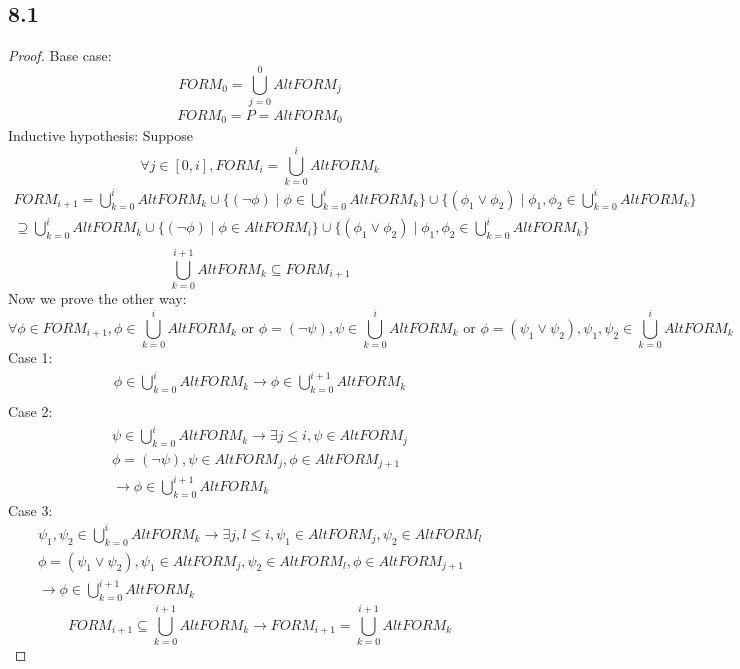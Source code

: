 \documentclass{article}
\newtheorem{lemma}[theorem]{Lemma}
\let\oldlemma\lemma
\let\endoldlemma\endlemma
\renewenvironment{lemma}
  {\begin{tcolorbox}[
      colback=green!8,
      colframe=green!50!black,
      boxrule=0.6pt,
      arc=2pt,
      left=6pt,right=6pt,top=4pt,bottom=4pt
    ]\oldlemma}
  {\endoldlemma\end{tcolorbox}}
\begin{document}
\subsection*{8.1}
\begin{lemma}
    
\end{lemma}
\begin{proof}
    Base case: \[FORM_0 = \bigcup_{j = 0}^0 AltFORM_j\]
    \begin{align*}
        FORM_0 = P = AltFORM_0
    \end{align*}
    Inductive hypothesis: Suppose
    \[\forall j \in [0, i], FORM_i = \bigcup_{k = 0}^i AltFORM_k\]
    \begin{align*}
        FORM_{i+1} = \bigcup_{k = 0}^i AltFORM_k \cup \{(\neg \phi) \mid \phi \in \bigcup_{k = 0}^i AltFORM_k\} \cup \{(\phi_1 \lor \phi_2) \mid \phi_1, \phi_2 \in \bigcup_{k = 0}^i AltFORM_k\}\\
        \supseteq \bigcup_{k = 0}^i AltFORM_k \cup \{(\neg \phi) \mid \phi \in AltFORM_i\} \cup \{(\phi_1 \lor \phi_2) \mid \phi_1, \phi_2 \in \bigcup_{k = 0}^i AltFORM_k\}\\
    \end{align*}
    \[\bigcup_{k = 0}^{i+1} AltFORM_k \subseteq FORM_{i+1}\]
    Now we prove the other way:
    \[\forall \phi \in FORM_{i+1}, \phi \in \bigcup_{k = 0}^i AltFORM_k \text{ or } \phi = (\neg \psi), \psi \in \bigcup_{k = 0}^i AltFORM_k \text{ or } \phi = (\psi_1 \lor \psi_2), \psi_1, \psi_2 \in \bigcup_{k = 0}^i AltFORM_k\]
    Case 1:
    \begin{align*}
        \phi \in \bigcup_{k = 0}^i AltFORM_k \rightarrow \phi \in \bigcup_{k = 0}^{i+1} AltFORM_k\\
    \end{align*}
    Case 2:
    \begin{align*}
        \psi \in  \bigcup_{k = 0}^i AltFORM_k \rightarrow \exists j \leq i, \psi \in AltFORM_j\\
        \phi = (\neg \psi), \psi \in AltFORM_j, \phi \in AltFORM_{j+1}\\
        \rightarrow \phi \in  \bigcup_{k = 0}^{i+1} AltFORM_k
    \end{align*}
    Case 3:
    \begin{align*}
        \psi_1, \psi_2 \in  \bigcup_{k = 0}^i AltFORM_k \rightarrow \exists j,l \leq i, \psi_1 \in AltFORM_j, \psi_2 \in AltFORM_l\\
        \phi = (\psi_1 \lor \psi_2), \psi_1 \in AltFORM_j, \psi_2 \in AltFORM_l, \phi \in AltFORM_{j+1}\\
        \rightarrow \phi \in  \bigcup_{k = 0}^{i+1} AltFORM_k
    \end{align*}
    \[FORM_{i+1} \subseteq  \bigcup_{k = 0}^{i+1} AltFORM_k \rightarrow FORM_{i+1} =  \bigcup_{k = 0}^{i+1} AltFORM_k\]
\end{proof}
\end{document}
